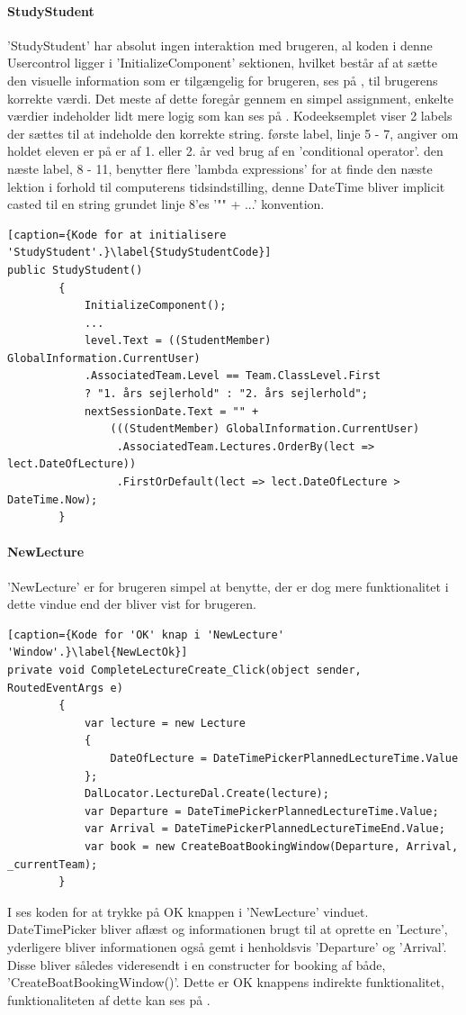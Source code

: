 \paragraph{StudyStudent}
'StudyStudent' har absolut ingen interaktion med brugeren, al koden i denne Usercontrol ligger i 'InitializeComponent' sektionen, hvilket består af at sætte den visuelle information som er tilgængelig for brugeren, ses på , til brugerens korrekte værdi. Det meste af dette foregår gennem en simpel assignment, enkelte værdier indeholder lidt mere logig som kan ses på \label{StudyStudentCode}. Kodeeksemplet viser 2 labels der sættes til at indeholde den korrekte string. første label, linje 5 - 7, angiver om holdet eleven er på er af 1. eller 2. år ved brug af en 'conditional operator'. den næste label, 8 - 11, benytter flere 'lambda expressions' for at finde den næste lektion i forhold til computerens tidsindstilling, denne DateTime bliver implicit casted til en string grundet linje 8'es '"" + ...' konvention.
\begin{lstlisting}[caption={Kode for at initialisere 'StudyStudent'.}\label{StudyStudentCode}]
public StudyStudent()
        {
            InitializeComponent();
			...
            level.Text = ((StudentMember) GlobalInformation.CurrentUser)
            .AssociatedTeam.Level == Team.ClassLevel.First
            ? "1. års sejlerhold" : "2. års sejlerhold";
            nextSessionDate.Text = "" +
                (((StudentMember) GlobalInformation.CurrentUser)
                 .AssociatedTeam.Lectures.OrderBy(lect => lect.DateOfLecture))
                 .FirstOrDefault(lect => lect.DateOfLecture > DateTime.Now);
        }
\end{lstlisting}

\paragraph{NewLecture}
'NewLecture' er for brugeren simpel at benytte, der er dog mere funktionalitet i dette vindue end der bliver vist for brugeren.

\begin{lstlisting}[caption={Kode for 'OK' knap i 'NewLecture' 'Window'.}\label{NewLectOk}]
private void CompleteLectureCreate_Click(object sender, RoutedEventArgs e)
        {
            var lecture = new Lecture
            {
                DateOfLecture = DateTimePickerPlannedLectureTime.Value
            };
            DalLocator.LectureDal.Create(lecture);
            var Departure = DateTimePickerPlannedLectureTime.Value;
            var Arrival = DateTimePickerPlannedLectureTimeEnd.Value;
            var book = new CreateBoatBookingWindow(Departure, Arrival, _currentTeam);
        }
\end{lstlisting}
I  ses koden for at trykke på OK knappen i 'NewLecture' vinduet. DateTimePicker bliver aflæst og informationen brugt til at oprette en 'Lecture', yderligere bliver informationen også gemt i henholdsvis 'Departure' og 'Arrival'. Disse bliver således videresendt i en constructer for booking af både, 'CreateBoatBookingWindow()'. Dette er OK knappens indirekte funktionalitet, funktionaliteten af dette kan ses på .

